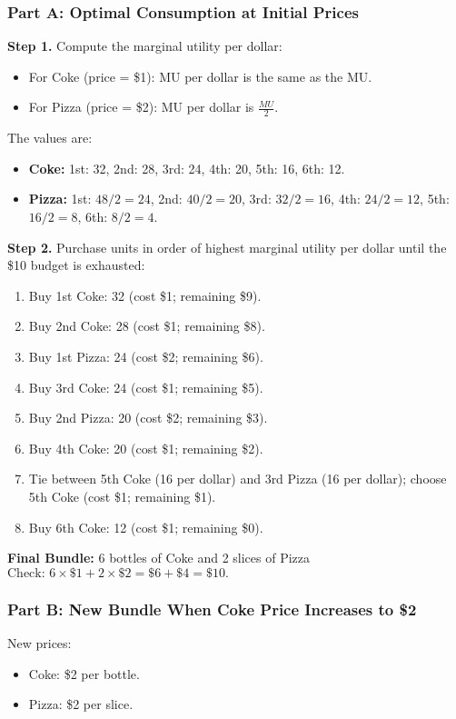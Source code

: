 \documentclass[12pt]{article}
\begin{document}
\subsubsection*{Part A: Optimal Consumption at Initial Prices}
\textbf{Step 1.} Compute the marginal utility per dollar:
\begin{itemize}[noitemsep]
    \item For Coke (price = \$1): MU per dollar is the same as the MU.
    \item For Pizza (price = \$2): MU per dollar is \( \frac{MU}{2} \).
\end{itemize}
The values are:
\begin{itemize}[noitemsep]
    \item \textbf{Coke:} 1st: 32, 2nd: 28, 3rd: 24, 4th: 20, 5th: 16, 6th: 12.
    \item \textbf{Pizza:} 1st: \(48/2 = 24\), 2nd: \(40/2 = 20\), 3rd: \(32/2 = 16\), 4th: \(24/2 = 12\), 5th: \(16/2 = 8\), 6th: \(8/2 = 4\).
\end{itemize}
\textbf{Step 2.} Purchase units in order of highest marginal utility per dollar until the \$10 budget is exhausted:
\begin{enumerate}[noitemsep]
    \item Buy 1st Coke: 32 (cost \$1; remaining \$9).
    \item Buy 2nd Coke: 28 (cost \$1; remaining \$8).
    \item Buy 1st Pizza: 24 (cost \$2; remaining \$6).
    \item Buy 3rd Coke: 24 (cost \$1; remaining \$5).
    \item Buy 2nd Pizza: 20 (cost \$2; remaining \$3).
    \item Buy 4th Coke: 20 (cost \$1; remaining \$2).
    \item Tie between 5th Coke (16 per dollar) and 3rd Pizza (16 per dollar); choose 5th Coke (cost \$1; remaining \$1).
    \item Buy 6th Coke: 12 (cost \$1; remaining \$0).
\end{enumerate}
\textbf{Final Bundle:} 6 bottles of Coke and 2 slices of Pizza \\
\(\text{Check: } 6 \times \$1 + 2 \times \$2 = \$6 + \$4 = \$10.\)

\subsubsection*{Part B: New Bundle When Coke Price Increases to \$2}
New prices:
\begin{itemize}[noitemsep]
    \item Coke: \$2 per bottle.
    \item Pizza: \$2 per slice.
\end{itemize}
\end{document}
